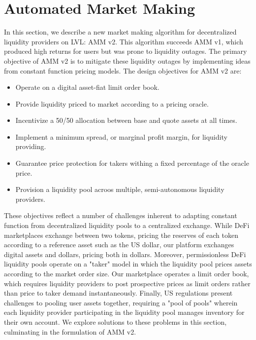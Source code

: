 \documentclass{article}
\begin{document}
\section{Automated Market Making}
\label{sec:amm}

In this section, we describe a new market making algorithm for decentralized liquidity providers on LVL: AMM v2. This algorithm succeeds AMM v1, which produced high returns for users but was prone to liquidity outages. The primary objective of AMM v2 is to mitigate these liquidity outages by implementing ideas from constant function pricing models. The design objectives for AMM v2 are:

\begin{itemize}
  \item Operate on a digital asset-fiat limit order book.
  \item Provide liquidity priced to market according to a pricing oracle.
  \item Incentivize a 50/50 allocation between base and quote assets at all times.
  \item Implement a minimum spread, or marginal profit margin, for liquidity providing.
  \item Guarantee price protection for takers withing a fixed percentage of the oracle price.
  \item Provision a liquidity pool acroos multiple, semi-autonomous liquidity providers.
\end{itemize}

These objectives reflect a number of challenges inherent to adapting constant function from decentralized liquidity pools to a centralized exchange. While DeFi marketplaces exchange between two tokens, pricing the reserves of each token according to a reference asset such as the US dollar, our platform exchanges digital assets and dollars, pricing both in dollars. Moreover, permissionless DeFi liquidity pools operate on a "taker" model in which the liquidity pool prices assets according to the market order size. Our marketplace operates a limit order book, which requires liquidity providers to post prospective prices as limit orders rather than price to taker demand instantaneously. Finally, US regulations present challenges to pooling user assets together, requiring a "pool of pools" wherein each liquidity provider participating in the liquidity pool manages inventory for their own account. We explore solutions to these problems in this section, culminating in the formulation of AMM v2.
\end{document}
